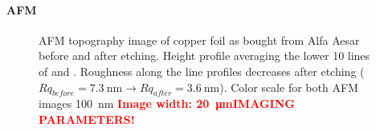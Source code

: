 \paragraph{AFM}
\label{sec:foil-AFM}
\begin{figure}[] \centering
	 \quad
	\caption{AFM topography image of copper foil as bought from Alfa Aesar  before and  after etching.  Height profile averaging the lower 10 lines of  and . Roughness along the line profiles decreases after etching ($Rq_{before}=\SI{7.3}{\nano \meter} \rightarrow Rq_{after}=\SI{3.6}{\nano \meter}$). Color scale for both AFM images \SI{100}{\nano \meter} \textcolor{red}{\textbf{Image width: \SI{20}{\micro \meter}IMAGING PARAMETERS!}}}
	\label{fig:foil-afm-as-bought}
\end{figure}

